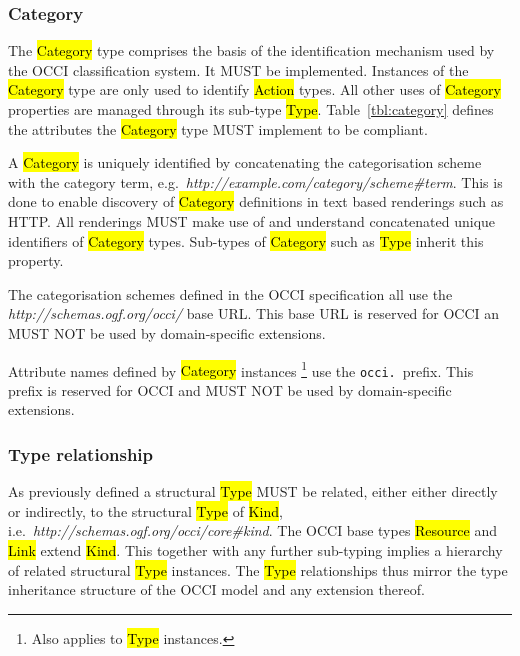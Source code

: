 \documentclass[10pt,a4paper,british]{article}
\begin{document}
\subsubsection{Category}
\label{sec:category}
The \hl{Category} type comprises the basis of the identification mechanism used
by the OCCI classification system. It MUST be implemented. Instances of the
\hl{Category} type are only used to identify \hl{Action} types. All other uses
of \hl{Category} properties are managed through its sub-type \hl{Type}.
%
Table~\ref{tbl:category} defines the attributes the \hl{Category} type MUST
implement to be compliant.


A \hl{Category} is uniquely identified by concatenating the categorisation
scheme with the category term,
e.g.~\textit{http://example.com/category/scheme\#term}.
This is done to enable discovery of \hl{Category} definitions in text based
renderings such as HTTP. All renderings MUST make use of and understand
concatenated unique identifiers of \hl{Category} types.
%
Sub-types of \hl{Category} such as \hl{Type} inherit this property.

The categorisation schemes defined in the OCCI specification all use the
\textit{http://schemas.ogf.org/occi/} base URL. This base URL is reserved for
OCCI an MUST NOT be used by domain-specific extensions.

Attribute names defined by \hl{Category} instances%
\footnote{Also applies to \hl{Type} instances.}
use the \texttt{occi.}~prefix.  This prefix is reserved for OCCI and MUST NOT
be used by domain-specific extensions.

\subsubsection{Type relationship}
\label{sec:type_relationship}
As previously defined a structural \hl{Type} MUST be related, either
either directly or indirectly, to the structural \hl{Type} of \hl{Kind},
i.e.~\textit{http://schemas.ogf.org/occi/core\#kind}.
%
The OCCI base types \hl{Resource} and \hl{Link} extend \hl{Kind}.  This
together with any further sub-typing implies a hierarchy of related structural
\hl{Type} instances.  The \hl{Type} relationships thus mirror the type
inheritance structure of the OCCI model and any extension thereof.
\end{document}
